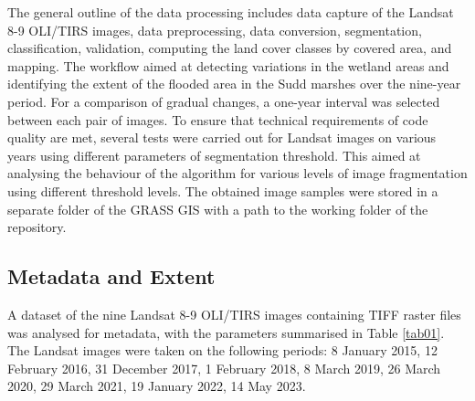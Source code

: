 \documentclass[analytics,article,accept,pdftex,moreauthors]{Definitions/mdpi}
\begin{document}
The general outline of the data processing includes data capture of the Landsat 8-9 OLI/TIRS images, data preprocessing, data conversion, segmentation, classification, validation, computing the land cover classes by covered area, and mapping. The workflow aimed at detecting variations in the wetland areas and identifying the extent of the flooded area in the Sudd marshes over the nine-year period. %
For a comparison of gradual changes, a one-year interval was selected between each pair of images. To ensure that technical requirements of code quality are met, several tests were carried out for Landsat images on various years using different parameters of segmentation threshold. This aimed at analysing the behaviour of the algorithm for various levels of image fragmentation using different threshold levels. The obtained image samples were stored in a separate folder of the GRASS GIS with a path to the working folder of the repository.


\subsection{Metadata and Extent}
A dataset of the nine Landsat 8-9 OLI/TIRS images containing TIFF raster files was analysed for metadata, with the parameters summarised in Table \ref{tab01}. {The Landsat images were taken on the following periods: 8 January 2015, 12 February 2016, 31 December 2017, 1 February 2018, 8 March 2019, 26 March 2020, 29 March 2021, 19 January 2022, 14 May 2023.}
\end{document}
